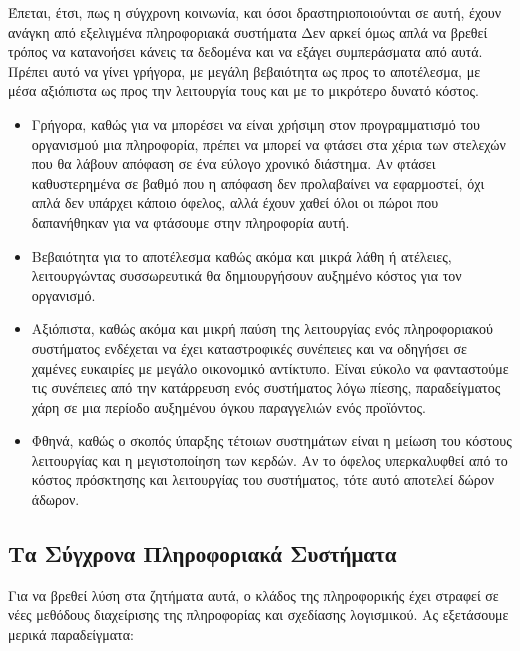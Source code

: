 \documentclass{article}
\begin{document}
Έπεται, έτσι, πως η σύγχρονη κοινωνία, και όσοι δραστηριοποιούνται σε αυτή, έχουν ανάγκη από εξελιγμένα πληροφοριακά συστήματα
Δεν αρκεί όμως απλά  να βρεθεί τρόπος να κατανοήσει κάνεις τα δεδομένα και να εξάγει συμπεράσματα από αυτά. Πρέπει αυτό να γίνει γρήγορα, με μεγάλη βεβαιότητα ως προς το αποτέλεσμα, με μέσα αξιόπιστα ως προς την λειτουργία τους και με το μικρότερο δυνατό κόστος.


\begin{itemize}
\item Γρήγορα, καθώς για να μπορέσει να είναι χρήσιμη στον προγραμματισμό του οργανισμού μια πληροφορία, πρέπει να μπορεί να φτάσει στα χέρια των στελεχών που θα λάβουν απόφαση σε ένα εύλογο χρονικό διάστημα. Αν φτάσει καθυστερημένα σε βαθμό που η απόφαση δεν προλαβαίνει να εφαρμοστεί, όχι απλά δεν υπάρχει κάποιο όφελος, αλλά έχουν χαθεί όλοι οι πώροι που δαπανήθηκαν για να φτάσουμε στην πληροφορία αυτή.
\item Βεβαιότητα για το αποτέλεσμα καθώς ακόμα και μικρά λάθη ή ατέλειες, λειτουργώντας συσσωρευτικά θα δημιουργήσουν αυξημένο κόστος για τον οργανισμό.
\item Αξιόπιστα, καθώς ακόμα και μικρή παύση της λειτουργίας ενός πληροφοριακού συστήματος ενδέχεται να έχει καταστροφικές συνέπειες και να οδηγήσει σε χαμένες ευκαιρίες με μεγάλο οικονομικό αντίκτυπο. Είναι εύκολο να φανταστούμε τις συνέπειες από την κατάρρευση ενός συστήματος λόγω πίεσης, παραδείγματος χάρη σε μια περίοδο αυξημένου όγκου παραγγελιών ενός προϊόντος.
\item Φθηνά, καθώς ο σκοπός ύπαρξης τέτοιων συστημάτων είναι η μείωση του κόστους λειτουργίας και η μεγιστοποίηση των κερδών. Αν το όφελος υπερκαλυφθεί από το κόστος πρόσκτησης και λειτουργίας του συστήματος, τότε αυτό αποτελεί δώρον άδωρον.
\end{itemize}

\subsection{Τα Σύγχρονα Πληροφοριακά Συστήματα}
Για να βρεθεί λύση στα ζητήματα αυτά, ο κλάδος της πληροφορικής έχει στραφεί σε νέες  μεθόδους διαχείρισης της πληροφορίας και σχεδίασης λογισμικού. Ας εξετάσουμε μερικά παραδείγματα:
\end{document}
